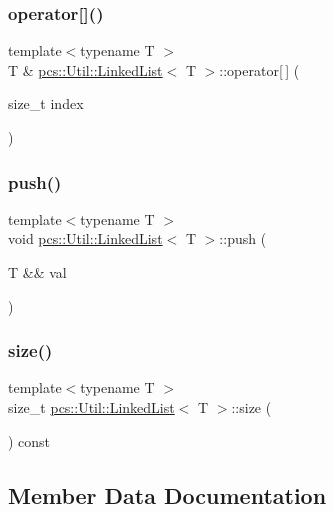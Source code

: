 \subsubsection{\texorpdfstring{operator[]()}{operator[]()}}
{\footnotesize\ttfamily template$<$typename T $>$ \\
T \& \hyperlink{classpcs_1_1Util_1_1LinkedList}{pcs\+::\+Util\+::\+Linked\+List}$<$ T $>$\+::operator\mbox{[}$\,$\mbox{]} (\begin{DoxyParamCaption}\item[{size\+\_\+t}]{index }\end{DoxyParamCaption})}

\mbox{\label{classpcs_1_1Util_1_1LinkedList_a79ddaedb4fbd61886c4326a9a9c34c5d}} 
\subsubsection{\texorpdfstring{push()}{push()}}
{\footnotesize\ttfamily template$<$typename T $>$ \\
void \hyperlink{classpcs_1_1Util_1_1LinkedList}{pcs\+::\+Util\+::\+Linked\+List}$<$ T $>$\+::push (\begin{DoxyParamCaption}\item[{T \&\&}]{val }\end{DoxyParamCaption})}

\mbox{\label{classpcs_1_1Util_1_1LinkedList_ac778698256b41a8085d3654056a4093a}} 
\subsubsection{\texorpdfstring{size()}{size()}}
{\footnotesize\ttfamily template$<$typename T $>$ \\
size\+\_\+t \hyperlink{classpcs_1_1Util_1_1LinkedList}{pcs\+::\+Util\+::\+Linked\+List}$<$ T $>$\+::size (\begin{DoxyParamCaption}{ }\end{DoxyParamCaption}) const}



\subsection{Member Data Documentation}
\mbox{\label{classpcs_1_1Util_1_1LinkedList_a3ce4faa5435a6f24917d9887ed8124d3}} 
